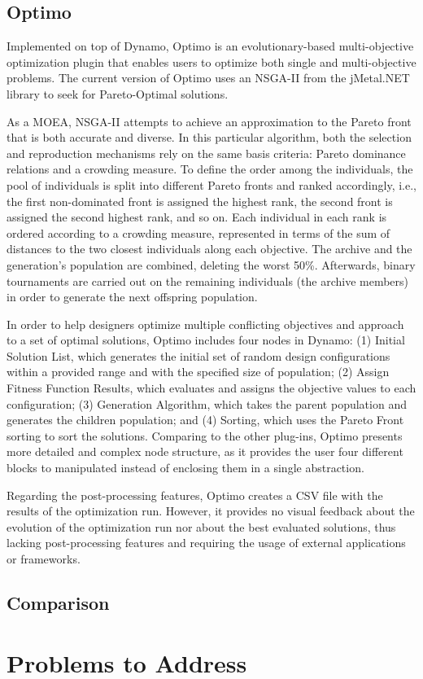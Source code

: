 \subsection{Optimo}
\label{subsec:Optimo}

Implemented on top of Dynamo, Optimo is an evolutionary-based multi-objective optimization plugin that enables users to optimize both single and multi-objective problems. The current version of Optimo uses an \ac{NSGA-II} \cite{Deb2002} from the jMetal.NET library to seek for Pareto-Optimal solutions. 

As a \ac{MOEA}, \ac{NSGA-II} attempts to achieve an approximation to the Pareto front that is both accurate and diverse. In this particular algorithm, both the selection and reproduction mechanisms rely on the same basis criteria: Pareto dominance relations and a crowding measure. To define the order among the individuals, the pool of individuals is split into different Pareto fronts and ranked accordingly, i.e., the first non-dominated front is assigned the highest rank, the second front is assigned the second highest rank, and so on. Each individual in each rank is ordered according to a crowding measure, represented in terms of the sum of distances to the two closest individuals along each objective. The archive and the generation's population are combined, deleting the worst 50\%. Afterwards, binary tournaments are carried out on the remaining individuals (the archive members) in order to generate the next offspring population.

In order to help designers optimize multiple conflicting objectives and approach to a set of optimal solutions, Optimo includes four nodes in Dynamo: (1) Initial Solution List, which generates the initial set of random design configurations within a provided range and with the specified size of population; (2) Assign Fitness Function Results, which evaluates and assigns the objective values to each configuration; (3) Generation Algorithm, which takes the parent population and generates the children population; and (4) Sorting, which uses the Pareto Front sorting to sort the solutions. Comparing to the other plug-ins, Optimo presents more detailed and complex node structure, as it provides the user four different blocks to manipulated instead of enclosing them in a single abstraction.

Regarding the post-processing features, Optimo creates a CSV file with the results of the optimization run. However, it provides no visual feedback about the evolution of the optimization run nor about the best evaluated solutions, thus lacking post-processing features and requiring the usage of external applications or frameworks.

\subsection{Comparison}




\section{Problems to Address}

